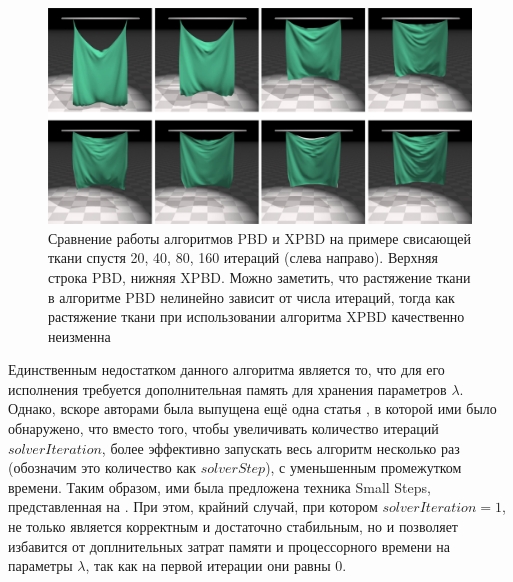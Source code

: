 	\begin{figure}[ht!] 
		\center
		\includegraphics [scale=0.4] {my_folder/images//pbd_vs_xpbd}
		\caption{Сравнение работы алгоритмов PBD и XPBD на примере свисающей ткани спустя 20, 40, 80, 160 итераций (слева направо). Верхняя строка PBD, нижняя XPBD. Можно заметить, что растяжение ткани в алгоритме PBD нелинейно зависит от числа итераций, тогда как растяжение ткани при использовании алгоритма XPBD качественно неизменна }
		\label{fig:pbd-vs-xpbd}  
	\end{figure}
	
	Единственным недостатком данного алгоритма является то, что для его исполнения требуется дополнительная память для хранения параметров $\lambda$. Однако, вскоре авторами была выпущена ещё одна статья \cite{macklin2019small}, в которой ими было обнаружено, что вместо того, чтобы увеличивать количество итераций $solverIteration$, более эффективно запускать весь алгоритм несколько раз (обозначим это количество как $solverStep$), с уменьшенным промежутком времени. Таким образом, ими была предложена техника Small Steps, представленная на . При этом, крайний случай, при котором $solverIteration = 1$, не только является корректным и достаточно стабильным, но и позволяет избавится от доплнительных затрат памяти и процессорного времени на параметры $\lambda$, так как на первой итерации они равны 0.
	
